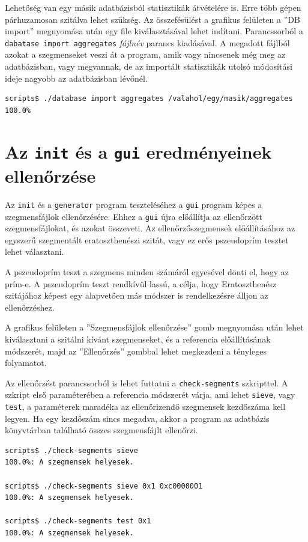 Lehetőség van egy másik adatbázisból statisztikák átvételére is.
Erre több gépen párhuzamosan szitálva lehet szükség.
Az összefésülést a grafikus felületen a ''DB import'' megnyomása után egy file kiválasztásával lehet indítani.
Parancssorból a \texttt{dabatase import aggregates} \textit{fájlnév} parancs kiadásával.
A megadott fájlból azokat a szegmenseket veszi át a program, amik vagy nincsenek még meg az adatbázisban, vagy megvannak, de az importált statisztikák utolsó módosítási ideje nagyobb az adatbázisban lévőnél.

\begin{lstlisting}[language=bash]
scripts$ ./database import aggregates /valahol/egy/masik/aggregates
100.0%
\end{lstlisting}

\section{Az \texttt{init} és a \texttt{gui} eredményeinek ellenőrzése}

Az \texttt{init} és a \texttt{generator} program teszteléséhez a \texttt{gui} program képes a szegmensfájlok ellenőrzésére.
Ehhez a \texttt{gui} újra előállítja az ellenőrzött szegmensfájlokat, és azokat összeveti.
Az ellenőrzőszegmensek előállításához az egyszerű szegmentált eratoszthenészi szitát, vagy ez erős pszeudoprím tesztet lehet választani.

A pszeudoprím teszt a szegmens minden számáról egyesével dönti el, hogy az prím-e.
A pszeudoprím teszt rendkívül lassú, a célja, hogy Eratoszthenész szitájához képest egy alapvetően más módszer is rendelkezésre álljon az ellenőrzéshez.

A grafikus felületen a ''Szegmensfájlok ellenőrzése'' gomb megnyomása után lehet kiválasztani a szitálni kívánt szegmenseket, és a referencia előállításának módszerét, majd az ''Ellenőrzés'' gombbal lehet megkezdeni a tényleges folyamatot.

Az ellenőrzést parancssorból is lehet futtatni a \texttt{check-segments} szkripttel.
A szkript első paraméterében a referencia módszerét várja, ami lehet \texttt{sieve}, vagy \texttt{test}, a paraméterek maradéka az ellenőrizendő szegmensek kezdőszáma kell legyen.
Ha egy kezdőszám sincs megadva, akkor a program az adatbázis könyvtárban található összes szegmensfájlt ellenőrzi.

\begin{lstlisting}[language=bash]
scripts$ ./check-segments sieve
100.0%: A szegmensek helyesek.             

scripts$ ./check-segments sieve 0x1 0xc0000001
100.0%: A szegmensek helyesek.             

scripts$ ./check-segments test 0x1
100.0%: A szegmensek helyesek.             

\end{lstlisting}


